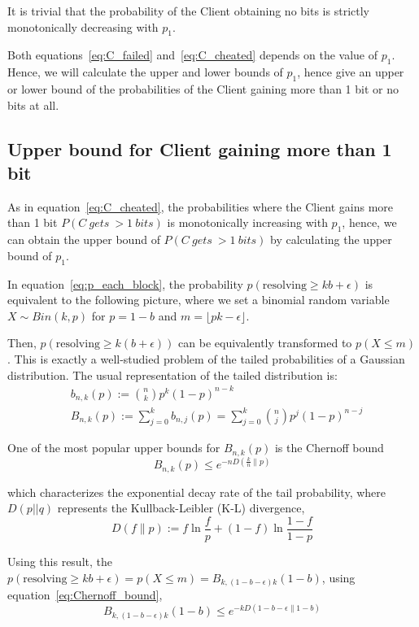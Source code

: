 \documentclass[%
 reprint,
superscriptaddress,
 amsmath,amssymb,
 aps,
]{revtex4-2}
\begin{document}
It is trivial that the probability of the Client obtaining no bits is strictly monotonically decreasing with $p_1$.

Both equations~\ref{eq:C_failed} and~\ref{eq:C_cheated} depends on the value of $p_1$. Hence, we will calculate the upper and lower bounds of $p_1$, hence give an upper or lower bound of the probabilities of the Client gaining more than 1 bit or no bits at all.

\subsection{Upper bound for Client gaining more than 1 bit}
As in equation~\ref{eq:C_cheated}, the probabilities where the Client gains more than 1 bit $P(C\ gets\ > 1\ bits)$ is monotonically increasing with $p_1$, hence, we can obtain the upper bound of $P(C\ gets\ > 1\ bits)$ by calculating the upper bound of $p_1$.

In equation~\ref{eq:p_each_block}, the probability $p(\text{resolving}\ge kb+\epsilon)$ is equivalent to the following picture, where we set a binomial random variable $X \sim Bin(k, p)$ for $p=1-b$ and $m = \lfloor pk-\epsilon\rfloor$. 

Then, $p(\text{resolving}\ge k(b+\epsilon))$ can be equivalently transformed to $p(X\le m)$. This is exactly a well-studied problem of the tailed probabilities of a Gaussian distribution. The usual representation of the tailed distribution is:
\begin{equation}
\begin{aligned}
&b_{n, k}(p):=\binom{n}{k} p^k (1-p)^{n-k}\\
&B_{n, k}(p):=\sum_{j=0}^k b_{n, j}(p)=\sum_{j=0}^k\binom{n}{j} p^j (1-p)^{n-j}
\end{aligned}
\end{equation}

One of the most popular upper bounds for $B_{n,k}(p)$ is the Chernoff bound
\begin{equation}
    B_{n,k}(p)\le e^{-nD\left(\frac{k}{n}\|p\right)}
    \label{eq:Chernoff_bound}
\end{equation}

which characterizes the exponential decay rate of the tail probability, where $D(p||q)$ represents the Kullback-Leibler (K-L) divergence, 
\begin{equation}
D(f \| p):=f \ln \frac{f}{p}+(1-f) \ln \frac{1-f}{1-p}
\end{equation}

Using this result, the $p(\text{resolving}\ge kb+\epsilon) = p(X\le m) = B_{k, (1-b-\epsilon)k}(1-b)$, using equation~\ref{eq:Chernoff_bound},
\begin{equation}
    B_{k, (1-b-\epsilon)k}(1-b)\le e^{-kD\left(1-b-\epsilon\|1-b\right)}
\end{equation}
\end{document}
